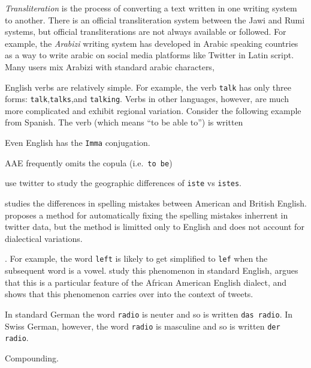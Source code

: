 \documentclass[sigconf,10pt]{acmart}
\newcommand{\str}[1]{\texttt{#1}}
\newcommand{\defn}[1]{\textit{#1}}
\begin{document}
\begin{description}[style=unboxed,leftmargin=0cm]
        \defn{Transliteration} is the process of converting a text written in one writing system to another.
        There is an official transliteration system between the Jawi and Rumi systems,
        but official transliterations are not always available or followed.
        For example, the \defn{Arabizi} writing system has developed in Arabic speaking countries as a way to write arabic on social media platforms like Twitter in Latin script.
        Many users mix Arabizi with standard arabic characters,\citep{bies2014transliteration,tobaili2016arabizi,van2016simple}

    \item[Verb conjugations.]
        English verbs are relatively simple.
        For example, the verb \str{talk} has only three forms:
        \str{talk},\str{talks},and \str{talking}.
        Verbs in other languages, however, 
        are much more complicated and exhibit regional variation.
        Consider the following example from Spanish.
        The verb  (which means ``to be able to'') is written

        Even English has the \str{Imma} conjugation.

        AAE frequently omits the copula (i.e.\ \str{to be}) \citep{pullum1999african} 

        \citet{tinoco2017variation} use twitter to study the geographic differences of \str{iste} vs \str{istes}.

    \item[Spelling errors.]
        \citep{treiman2000dialect} studies the differences in spelling mistakes between American and British English.
        \citet{ahmed2015lexical} proposes a method for automatically fixing the spelling mistakes inherrent in twitter data,
        but the method is limitted only to English and does not account for dialectical variations.
%
    \item[Consonant cluster reduction].
For example, the word \str{left} is likely to get simplified to \str{lef} when the subsequent word is a vowel.
\citet{guy1991contextual,tagliamonte2005new} study this phenomenon in standard English,
\citet{pullum1999african} argues that this is a particular feature of the African American English dialect,
and \citet{eisenstein2013phonological} shows that this phenomenon carries over into the context of tweets.

    \item[Relationships between words.]
        In standard German the word \str{radio} is neuter and so is written \str{das radio}.
        In Swiss German, however, the word \str{radio} is masculine and so is written \str{der radio}. \citep{hollenstein2014compilation}

        Compounding.

\end{description}
\end{document}
